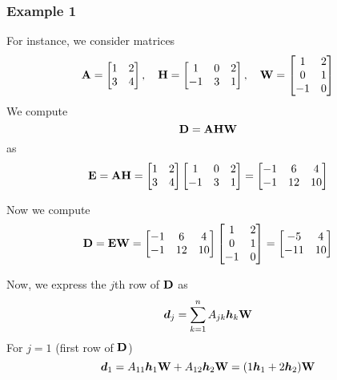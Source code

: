 \documentclass[aps, prd, showpacs, floatfix, superscriptaddress, twocolumn, nofootinbib, preprintnumbers, longbibliography]{revtex4-2}
\begin{document}

\subsubsection{Example 1}\label{eg_1}
For instance, we consider matrices
\[
{\bf A} =
\begin{bmatrix}
1 & 2 \\
3 & 4
\end{bmatrix}, \quad
{\bf H} =
\begin{bmatrix}
1 & 0 & 2 \\
-1 & 3 & 1
\end{bmatrix}, \quad
{\bf W} =
\begin{bmatrix}
1 & 2 \\
0 & 1 \\
-1 & 0
\end{bmatrix}
\]
We compute
\[
{\bf D = A H W}
\]
as
\[
{\bf E = A H} =
\begin{bmatrix}
1 & 2 \\
3 & 4
\end{bmatrix}
\begin{bmatrix}
1 & 0 & 2 \\
-1 & 3 & 1
\end{bmatrix}
 =
\begin{bmatrix}
-1 & 6 & 4 \\
-1 & 12 & 10
\end{bmatrix}
\]

Now we compute 
\[
 {\bf D = E W}=
\begin{bmatrix}
-1 & 6 & 4 \\
-1 & 12 & 10
\end{bmatrix}
\begin{bmatrix}
1 & 2 \\
0 & 1 \\
-1 & 0
\end{bmatrix}
 =
\begin{bmatrix}
-5 & 4 \\
-11 & 10
\end{bmatrix}
\]

Now, we express the \( j \)th row of \( {\bf D} \) as
\[
\bm{d}_j = \sum_{k=1}^{n} A_{jk} \bm{h}_k {\bf W}
\]
For \( j = 1 \) (first row of \( {\bf D} \))
\[
\bm{d}_1 = A_{11} \bm{h}_1 {\bf W} + A_{12} \bm{h}_2 {\bf W}
 = (1 \bm{h}_1 + 2 \bm{h}_2) {\bf W}
\]
\end{document}
